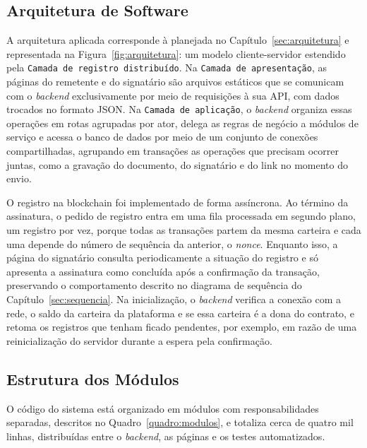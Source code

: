 \documentclass[
    12pt,
    a4paper,
    oneside,
    chapter=TITLE,
    section=TITLE,
    subsection=TITLE,
    subsubsection=TITLE,
    sumario=tradicional,
    english,
    brazil
]{abntex2}
\newcommand{\elem}[1]{\texttt{#1}}
\begin{document}
\subsection{Arquitetura de Software}
\label{sec:impl-arquitetura}

A arquitetura aplicada corresponde à planejada no Capítulo~\ref{sec:arquitetura} e representada na Figura~\ref{fig:arquitetura}: um modelo cliente-servidor estendido pela \elem{Camada de registro distribuído}. Na \elem{Camada de apresentação}, as páginas do remetente e do signatário são arquivos estáticos que se comunicam com o \emph{backend} exclusivamente por meio de requisições à sua API, com dados trocados no formato JSON. Na \elem{Camada de aplicação}, o \emph{backend} organiza essas operações em rotas agrupadas por ator, delega as regras de negócio a módulos de serviço e acessa o banco de dados por meio de um conjunto de conexões compartilhadas, agrupando em transações as operações que precisam ocorrer juntas, como a gravação do documento, do signatário e do link no momento do envio.

O registro na blockchain foi implementado de forma assíncrona. Ao término da assinatura, o pedido de registro entra em uma fila processada em segundo plano, um registro por vez, porque todas as transações partem da mesma carteira e cada uma depende do número de sequência da anterior, o \emph{nonce}. Enquanto isso, a página do signatário consulta periodicamente a situação do registro e só apresenta a assinatura como concluída após a confirmação da transação, preservando o comportamento descrito no diagrama de sequência do Capítulo~\ref{sec:sequencia}. Na inicialização, o \emph{backend} verifica a conexão com a rede, o saldo da carteira da plataforma e se essa carteira é a dona do contrato, e retoma os registros que tenham ficado pendentes, por exemplo, em razão de uma reinicialização do servidor durante a espera pela confirmação.

\subsection{Estrutura dos Módulos}

O código do sistema está organizado em módulos com responsabilidades separadas, descritos no Quadro~\ref{quadro:modulos}, e totaliza cerca de quatro mil linhas, distribuídas entre o \emph{backend}, as páginas e os testes automatizados.
\end{document}
